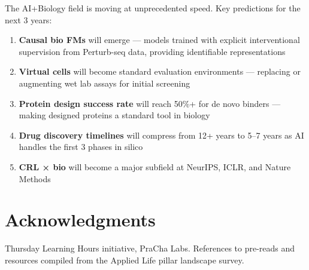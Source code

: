 \documentclass[11pt]{article}
\begin{document}
The AI+Biology field is moving at unprecedented speed. Key predictions for the next 3 years:
\begin{enumerate}
\item \textbf{Causal bio FMs} will emerge --- models trained with explicit interventional supervision from Perturb-seq data, providing identifiable representations
\item \textbf{Virtual cells} will become standard evaluation environments --- replacing or augmenting wet lab assays for initial screening
\item \textbf{Protein design success rate} will reach 50\%+ for de novo binders --- making designed proteins a standard tool in biology
\item \textbf{Drug discovery timelines} will compress from 12+ years to 5--7 years as AI handles the first 3 phases in silico
\item \textbf{CRL × bio} will become a major subfield at NeurIPS, ICLR, and Nature Methods
\end{enumerate}

\section*{Acknowledgments}
Thursday Learning Hours initiative, PraCha Labs. References to pre-reads and resources compiled from the Applied Life pillar landscape survey.
\end{document}
